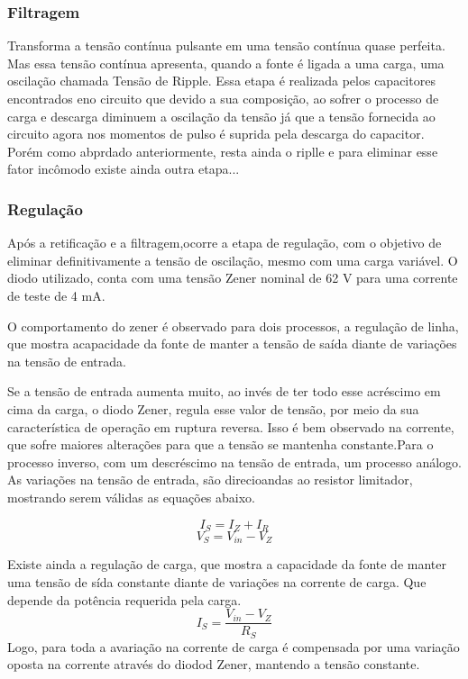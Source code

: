 \documentclass[a4paper,12pt,oneside,openany,table,xcdraw]{article}
\begin{document}
\subsubsection{Filtragem}
Transforma a tensão contínua pulsante em uma tensão contínua quase perfeita. Mas essa tensão contínua apresenta, quando a fonte é ligada a uma carga, uma oscilação chamada Tensão de Ripple. Essa etapa é realizada pelos capacitores encontrados eno circuito que devido a sua composição, ao sofrer o processo de carga e descarga diminuem a oscilação da tensão já que a tensão fornecida ao circuito agora nos momentos de pulso é suprida pela descarga do capacitor. Porém como abprdado anteriormente, resta ainda o riplle e para eliminar esse fator incômodo existe ainda outra etapa...

\subsubsection{Regulação}
Após a retificação e a filtragem,ocorre a etapa de regulação, com o objetivo de eliminar definitivamente a tensão de oscilação, mesmo com uma carga variável. O diodo utilizado, conta com uma tensão Zener nominal de 62 V para uma corrente de teste de 4 mA.

O comportamento do zener é observado para dois processos, a regulação de linha, que mostra acapacidade da fonte de manter a tensão de saída diante de variações na tensão de entrada.

Se a tensão de entrada aumenta muito, ao invés de ter todo esse acréscimo em cima da carga, o diodo Zener, regula esse valor de tensão, por meio da sua característica de operação em ruptura reversa. Isso é bem observado na corrente, que sofre maiores alterações para que a tensão se mantenha constante.Para o processo inverso, com um descréscimo na tensão de entrada, um processo análogo. As variações na tensão de entrada, são direcioandas ao resistor limitador, mostrando serem válidas as equações abaixo.

\begin{equation}
I_{S}  = I_{Z} +I_{R}  
\end{equation}
\begin{equation}
V_{S}  = V_{in} - V_{Z}
\end{equation}

Existe ainda a  regulação de carga, que mostra a capacidade da fonte de manter uma tensão de sída constante diante de variações na corrente de carga. Que depende da potência requerida pela carga.
\begin{equation}
I_{S}  =\frac{ V_{in} - V_{Z}  }{R_{S}}
\end{equation}
Logo, para toda a avariação na corrente de carga é compensada por uma variação oposta na corrente através do diodod Zener, mantendo a tensão constante.
\end{document}
